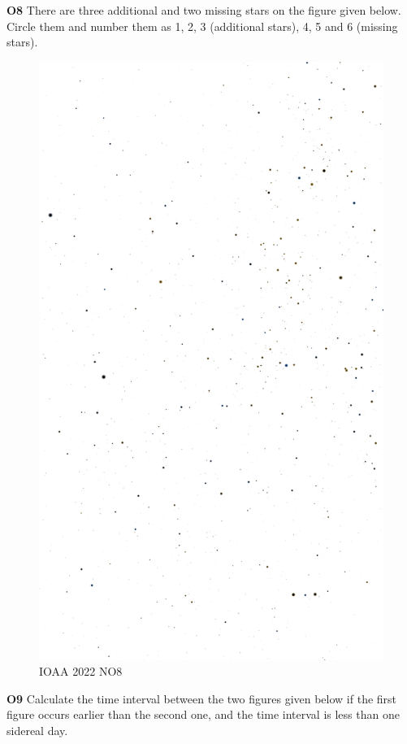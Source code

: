 \documentclass[a4paper,12pt]{extarticle}
\begin{document}
\textbf{O8} There are three additional and two missing stars on the figure given below. Circle them and number them as 1, 2, 3 (additional stars), 4, 5 and 6 (missing stars). 
\begin{figure}[H]
	\centering
	\includegraphics[width=0.76\linewidth]{ioaa22_3.png}
	\caption{IOAA 2022 NO8}
\end{figure}
\clearpage
\textbf{O9} Calculate the time interval between the two figures given below if the first figure occurs earlier than the second one, and the time interval is less than one sidereal day.
\end{document}
